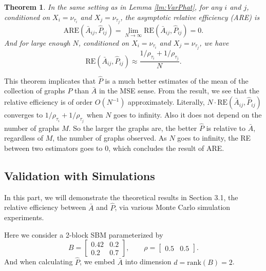 \documentclass[a4paper]{article}
\newtheorem{theorem}[fact]{Theorem}
\begin{document}
\begin{theorem}
\label{thm:ARE}
In the same setting as in Lemma \ref{lm:VarPhat}, for any $i$ and $j$, conditioned on $X_i = \nu_{\tau_i}$ and $X_j = \nu_{\tau_j}$, the asymptotic relative efficiency (ARE) is 
\[
	\mathrm{ARE}(\bar{A}_{ij}, \hat{P}_{ij}) = \lim_{N \to \infty} \mathrm{RE}(\bar{A}_{ij}, \hat{P}_{ij}) = 0.
\]
And for large enough $N$, conditioned on $X_i = \nu_{\tau_i}$ and $X_j = \nu_{\tau_j}$, we have
\[
	\mathrm{RE}(\bar{A}_{ij}, \hat{P}_{ij}) \approx
    \frac{1/\rho_{\tau_i} + 1/\rho_{\tau_j}}{N}.
\]
\end{theorem}

This theorem implicates that $\hat{P}$ is a much better estimates of the mean of the collection of graphs $P$ than $\bar{A}$ in the MSE sense. From the result, we see that the relative efficiency is of order $O(N^{-1})$ approximately. Literally, $N \cdot \mathrm{RE}(\bar{A}_{ij}, \hat{P}_{ij})$ converges to $1/\rho_{\tau_i}+1/\rho_{\tau_j}$ when $N$ goes to infinity. Also it does not depend on the number of graphs $M$. So the larger the graphs are, the better $\hat{P}$ is relative to $\bar{A}$, regardless of $M$, the number of graphs observed. As $N$ goes to infinity, the RE between two estimators goes to 0, which concludes the result of ARE.


\subsection{Validation with Simulations}
In this part, we will demonstrate the theoretical results in Section 3.1, the relative efficiency between $\bar{A}$ and $\hat{P}$, via various Monte Carlo simulation experiments.

Here we consider a 2-block SBM parameterized by
\begin{equation*}
B = \begin{bmatrix}
0.42 & 0.2 \\
0.2 & 0.7
\end{bmatrix}
,\qquad \rho = \begin{bmatrix}
0.5 & 0.5
\end{bmatrix}.
\end{equation*}
And when calculating $\hat{P}$, we embed $\bar{A}$ into dimension $d = \mathrm{rank}(B) = 2$.
\end{document}
